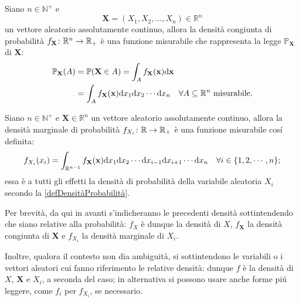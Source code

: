         \begin{dfn}
            \label{defDensitàCongiuntaProbabilità}
            Siano \(n\in\mathbb N^+\) e \[\mathbf X=(X_1,X_2,\ldots,X_n)\in\mathbb R^n\] un vettore aleatorio assolutamente continuo, allora la densità congiunta di probabilità \(f_{\mathbf X}\colon\mathbb R^n\to\mathbb R_+\) è una funzione misurabile che rappresenta la legge \(\mathbb P_{\mathbf X}\) di \(\mathbf X\):
            \[
                \begin{aligned}
                    \mathbb P_{\mathbf X}(A)&=\mathbb P(\mathbf X\in A)
                    =\int_Af_{\mathbf X}(\mathbf x)\mathrm{d}\mathbf x\\
                    &=\int_Af_{\mathbf X}(\mathbf x)\mathrm{d} x_1\mathrm{d} x_2\cdots\mathrm{d} x_n
                    \quad\forall A\subseteq\mathbb R^n\text{ misurabile}.
                \end{aligned}
            \]
        \end{dfn}
        
        \begin{dfn}
            \label{defDensitàMarginaleProbabilità}
            Siano \(n\in\mathbb N^+\) e \(\mathbf X\in\mathbb R^n\) un vettore aleatorio assolutamente continuo, allora la densità marginale di probabilità \(f_{X_i}\colon\mathbb R\to\mathbb R_+\) è una funzione misurabile cosí definita:
            \begin{equation}
                \label{eqDensitàMarginaleProbabilità}
                f_{X_i}(x_i)=\int_{\mathbb R^{n-1}}
                f_{\mathbf X}(\mathbf x)\mathrm{d} x_1\mathrm{d} x_2\cdots\mathrm{d} x_{i-1}\mathrm{d} x_{i+1}\cdots\mathrm{d} x_n
                \quad\forall i\in\{1,2,\cdots,n\};
            \end{equation}
            essa è a tutti gli effetti la densità di probabilità della variabile aleatoria \(X_i\) secondo la \cref{defDensitàProbabilità}.
        \end{dfn}

        \begin{oss}
            Per brevità, da qui in avanti s'indicheranno le precedenti densità sottintendendo che siano relative alla probabilità: \(f_X\) è dunque la densità di \(X\), \(f_{\mathbf X}\) la densità congiunta di \(\mathbf X\) e \(f_{X_i}\) la densità marginale di \(X_i\).

            Inoltre, qualora il contesto non dia ambiguità, si sottintendono le variabili o i vettori aleatori cui fanno riferimento le relative densità: dunque \(f\) è la densità di \(X\), \(\mathbf X\) e \(X_i\), a seconda del caso; in alternativa si possono usare anche forme piú leggere, come \(f_i\) per \(f_{X_i}\), se necessario.
        \end{oss}

